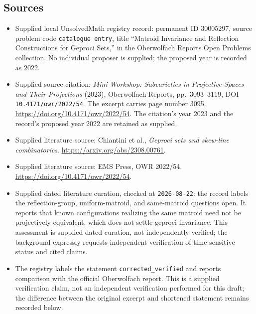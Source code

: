 \documentclass[11pt]{article}
\begin{document}
\subsection{Sources}
\begin{itemize}
\item Supplied local UnsolvedMath registry record: permanent ID \(30005297\), source problem code \texttt{catalogue entry}, title ``Matroid Invariance and Reflection Constructions for Geproci Sets,'' in the Oberwolfach Reports Open Problems collection. No individual proposer is supplied; the proposed year is recorded as 2022.
\item Supplied source citation: \emph{Mini-Workshop: Subvarieties in Projective Spaces and Their Projections} (2023), Oberwolfach Reports, pp.\ 3093--3119, DOI \texttt{10.4171/owr/2022/54}. The excerpt carries page number 3095. \url{https://doi.org/10.4171/owr/2022/54}. The citation's year 2023 and the record's proposed year 2022 are retained as supplied.
\item Supplied literature source: Chiantini et al., \emph{Geproci sets and skew-line combinatorics}. \url{https://arxiv.org/abs/2308.00761}.
\item Supplied literature source: EMS Press, OWR 2022/54. \url{https://doi.org/10.4171/owr/2022/54}.
\item Supplied dated literature curation, checked at \texttt{2026-08-22}: the record labels the reflection-group, uniform-matroid, and same-matroid questions open. It reports that known configurations realizing the same matroid need not be projectively equivalent, which does not settle geproci invariance. This assessment is supplied dated curation, not independently verified; the background expressly requests independent verification of time-sensitive status and cited claims.
\item The registry labels the statement \texttt{corrected\_verified} and reports comparison with the official Oberwolfach report. This is a supplied verification claim, not an independent verification performed for this draft; the difference between the original excerpt and shortened statement remains recorded below.
\end{itemize}
\end{document}
